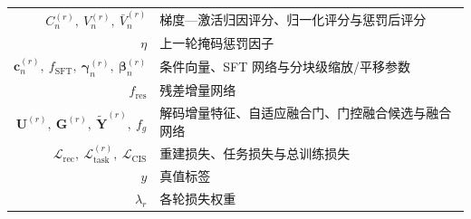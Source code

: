 \begin{nomenclature}
\begin{longtable}{rl}
  $C_n^{(r)},\ V_n^{(r)},\ \bar V_n^{(r)}$ & 梯度—激活归因评分、归一化评分与惩罚后评分 \\
  $\eta$                                & 上一轮掩码惩罚因子 \\
  $\mathbf c_n^{(r)},\ f_{\mathrm{SFT}},\ \boldsymbol\gamma_n^{(r)},\ \boldsymbol\beta_n^{(r)}$ & 条件向量、SFT 网络与分块级缩放/平移参数 \\
  $f_{\mathrm{res}}$ & 残差增量网络 \\
  $\mathbf U^{(r)},\ \mathbf G^{(r)},\ \tilde{\mathbf Y}^{(r)},\ f_g$ & 解码增量特征、自适应融合门、门控融合候选与融合网络 \\
  $\mathcal L_{\mathrm{rec}},\ \mathcal L_{\mathrm{task}}^{(r)},\ \mathcal L_{\mathrm{CIS}}$ & 重建损失、任务损失与总训练损失 \\
  $y$ & 真值标签 \\
  $\lambda_r$ & 各轮损失权重 \\
\end{longtable}

\end{nomenclature}

